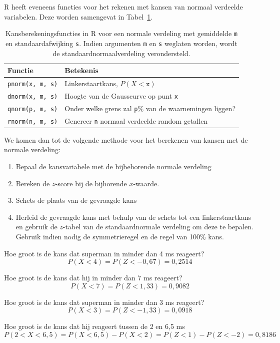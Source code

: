 {R heeft eveneens functies voor het rekenen met kansen van normaal verdeelde variabelen. Deze worden samengevat in Tabel~\ref{rab:norm-prob-r}.

\begin{table}
  \centering
  \begin{tabular}{ll}
  	\textbf{Functie}      & \textbf{Betekenis}                                             \\ \hline
  	\verb|pnorm(x, m, s)| & Linkerstaartkans, $P(X<\mathtt{x})$                            \\
  	\verb|dnorm(x, m, s)| & Hoogte van de Gausscurve op punt \texttt{x}                    \\
  	\verb|qnorm(p, m, s)| & Onder welke grens zal \texttt{p}\% van de waarnemingen liggen? \\
  	\verb|rnorm(n, m, s)| & Genereer \texttt{n} normaal verdeelde random getallen
  \end{tabular}

  \caption{Kansberekeningsfuncties in R voor een normale verdeling met gemiddelde \texttt{m} en standaardafwijking \texttt{s}. Indien argumenten \texttt{m} en \texttt{s} weglaten worden, wordt de standaardnormaalverdeling verondersteld.}
  \label{rab:norm-prob-r}
\end{table}

We komen dan tot de volgende methode voor het berekenen van kansen met de normale verdeling:
\begin{enumerate}
  \item Bepaal de kansvariabele met de bijbehorende normale verdeling
  \item Bereken de $z$-score bij de bijhorende $x$-waarde.
  \item Schets de plaats van de gevraagde kans
  \item Herleid de gevraagde kans met behulp van de schets tot een linkerstaartkans en gebruik de $z$-tabel van de standaardnormale verdeling om deze te bepalen. Gebruik indien nodig de symmetrieregel en de regel van 100\% kans.
\end{enumerate}

\begin{example}
Hoe groot is de kans dat superman in minder dan 4 ms reageert?
\[ P(X < 4) = P(Z < -0,67) = 0,2514 \]
\end{example}
\begin{example}
Hoe groot is de kans dat hij in minder dan 7 ms reageert?
\[ P(X < 7) = P(Z < 1,33) = 0,9082 \]
\end{example}
\begin{example}
Hoe groot is de kans dat superman in minder dan 3 ms reageert?
\[ P(X<3) = P(Z < -1,33) = 0,0918 \]
\end{example}
\begin{example}
Hoe groot is de kans dat hij reageert tussen de 2 en 6,5 ms
\[ P( 2 < X < 6,5) = P(X<6,5) - P(X<2) = P(Z<1) - P(Z<-2) = 0,8186 \]
\end{example}

}
